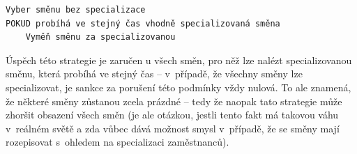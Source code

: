 \documentclass[twoside]{ctuthesis}
\begin{document}
\begin{lstlisting}[caption={Strategie pro obsazení specializovaných směn}, label={lst:specialize}]
Vyber směnu bez specializace
POKUD probíhá ve stejný čas vhodně specializovaná směna
	Vyměň směnu za specializovanou
\end{lstlisting}



%

Úspěch této strategie je zaručen u všech směn, pro něž lze nalézt specializovanou směnu, která probíhá ve stejný čas – v~případě, že všechny směny lze specializovat, je sankce za porušení této podmínky vždy nulová. To ale znamená, že některé směny zůstanou zcela prázdné – tedy že naopak tato strategie může zhoršit obsazení všech směn  (je ale otázkou, jestli tento fakt má takovou váhu v~reálném světě a zda vůbec dává možnost  smysl v~případě, že se směny mají rozepisovat s~ohledem na specializaci zaměstnanců).
\end{document}
